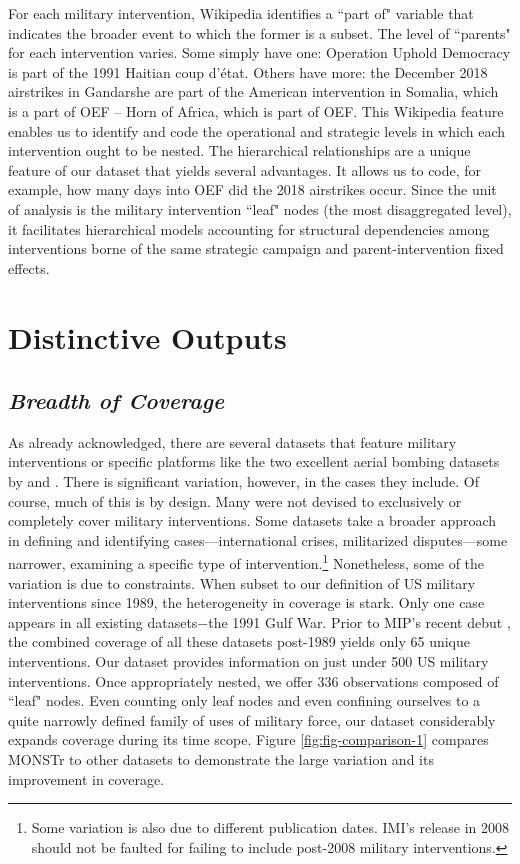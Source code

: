 \documentclass[fleqn,12pt]{article}
\begin{document}
For each military intervention, Wikipedia identifies a ``part of" variable that indicates the broader event to which the former is a subset. The level of ``parents" for each intervention varies. Some simply have one: Operation Uphold Democracy is part of the 1991 Haitian coup d'état. Others have more: the December 2018 airstrikes in Gandarshe are part of the American intervention in Somalia, which is a part of OEF – Horn of Africa, which is part of OEF. This Wikipedia feature enables us to identify and code the operational and strategic levels in which each intervention ought to be nested. The hierarchical relationships are a unique feature of our dataset that yields several advantages. It allows us to code, for example, how many days into OEF did the 2018 airstrikes occur. Since the unit of analysis is the military intervention ``leaf" nodes (the most disaggregated level), it facilitates hierarchical models accounting for structural dependencies among interventions borne of the same strategic campaign and parent-intervention fixed effects.

\section*{Distinctive Outputs}
\subsection*{\textit{Breadth of Coverage}}
As already acknowledged, there are several datasets that feature military interventions or specific platforms like the two excellent aerial bombing datasets by \citet{HorowitzReiter01} and \citet{AllenMM17}. There is significant variation, however, in the cases they include. Of course, much of this is by design. Many were not devised to exclusively or completely cover military interventions. Some datasets take a broader approach in defining and identifying cases—international crises, militarized disputes—some narrower, examining a specific type of intervention.\footnote{Some variation is also due to different publication dates. IMI's release in 2008 should not be faulted for failing to include post-2008 military interventions.} Nonetheless, some of the variation is due to constraints. When subset to our definition of US military interventions since 1989, the heterogeneity in coverage is stark. Only one case appears in all existing datasets$-$the 1991 Gulf War. Prior to MIP’s recent debut \citep{KushiDT22}, the combined coverage of all these datasets post-1989 yields only 65 unique interventions. Our dataset provides information on just under 500 US military interventions. Once appropriately nested, we offer 336 observations composed of ``leaf" nodes. Even counting only leaf nodes and even confining ourselves to a quite narrowly defined family of uses of military force, our dataset considerably expands coverage during its time scope. Figure \ref{fig:fig-comparison-1} compares MONSTr to other datasets to demonstrate the large variation and its improvement in coverage.
\end{document}
